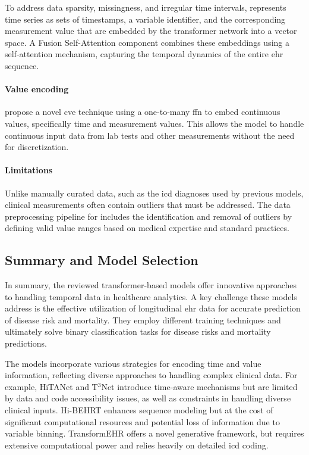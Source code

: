 To address data sparsity, missingness, and irregular time intervals,  represents time series as sets of timestamps, a variable identifier, and the corresponding measurement value that are embedded by the transformer network into a vector space. A Fusion Self-Attention component combines these embeddings using a self-attention mechanism, capturing the temporal dynamics of the entire \gls{ehr} sequence.

\paragraph{Value encoding}

\textcite{STraTS2022} propose a novel \gls{cve} technique using a one-to-many \gls{ffn} to embed continuous values, specifically time and measurement values. This allows the model to handle continuous input data from lab tests and other measurements without the need for discretization.


\paragraph{Limitations}
Unlike manually curated data, such as the \gls{icd} diagnoses used by previous models, clinical measurements often contain outliers that must be addressed. The data preprocessing pipeline for  includes the identification and removal of outliers by defining valid value ranges based on medical expertise and standard practices.

\subsection{Summary and Model Selection}

In summary, the reviewed transformer-based models offer innovative approaches to handling temporal data in healthcare analytics. A key challenge these models address is the effective utilization of longitudinal \gls{ehr} data for accurate prediction of disease risk and mortality. They employ different training techniques and ultimately solve binary classification tasks for disease risks and mortality predictions.

The models incorporate various strategies for encoding time and value information, reflecting diverse approaches to handling complex clinical data. For example, HiTANet and T$^3$Net introduce time-aware mechanisms but are limited by data and code accessibility issues, as well as constraints in handling diverse clinical inputs. Hi-BEHRT enhances sequence modeling but at the cost of significant computational resources and potential loss of information due to variable binning. TransformEHR offers a novel generative framework, but requires extensive computational power and relies heavily on detailed \gls{icd} coding.

